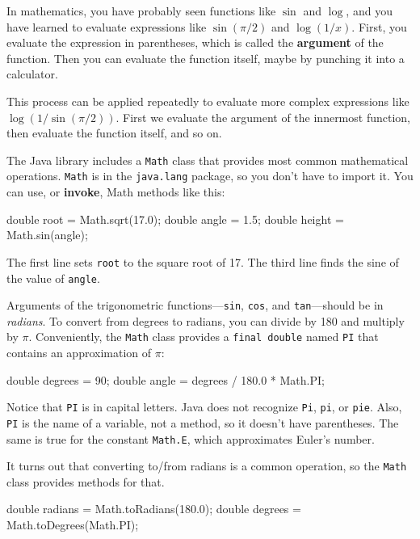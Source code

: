 \documentclass[12pt]{book}
\theoremstyle{exercise}
\newcommand{\java}[1]{\verb"#1"}
\newcommand{\java}[1]{\lstinline{#1}} %
\begin{document}
In mathematics, you have probably seen functions like $\sin$ and $\log$, and you have learned to evaluate expressions like $\sin(\pi/2)$ and $\log(1/x)$.
First, you evaluate the expression in parentheses, which is called the {\bf argument} of the function.
Then you can evaluate the function itself, maybe by punching it into a calculator.

This process can be applied repeatedly to evaluate more complex expressions like $\log(1/\sin(\pi/2))$.
First we evaluate the argument of the innermost function, then evaluate the function itself, and so on.

The Java library includes a \java{Math} class that provides most common mathematical operations.
\java{Math} is in the \java{java.lang} package, so you don't have to import it.
You can use, or {\bf invoke}, Math methods like this:

\begin{code}
    double root = Math.sqrt(17.0);
    double angle = 1.5;
    double height = Math.sin(angle);
\end{code}

The first line sets \java{root} to the square root of 17.
The third line finds the sine of the value of \java{angle}.


Arguments of the trigonometric functions---\java{sin}, \java{cos}, and \java{tan}---should be in {\em radians}.
To convert from degrees to radians, you can divide by 180 and multiply by $\pi$.
Conveniently, the \java{Math} class provides a \java{final double} named \java{PI} that contains an approximation of $\pi$:

\begin{code}
    double degrees = 90;
    double angle = degrees / 180.0 * Math.PI;
\end{code}

Notice that \java{PI} is in capital letters.
Java does not recognize \java{Pi}, \java{pi}, or \java{pie}.
Also, \java{PI} is the name of a variable, not a method, so it doesn't have parentheses.
The same is true for the constant \java{Math.E}, which approximates Euler's number.

It turns out that converting to/from radians is a common operation, so the \java{Math} class provides methods for that.

\begin{code}
    double radians = Math.toRadians(180.0);
    double degrees = Math.toDegrees(Math.PI);
\end{code}
\end{document}

